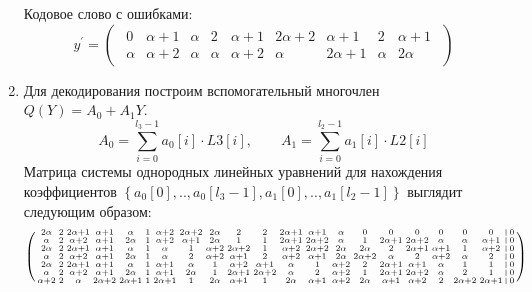 \documentclass{article}
\numberwithin{equation}{section}
\begin{document}
\begin{enumerate}
	Кодовое слово с ошибками:
	\[
		y^{'} =
		\begin{pmatrix}
			\begin{matrix} 
				0 & \alpha + 1 & \alpha & 2 & \alpha + 1 & 2\alpha + 2 & \alpha + 1 & 2 & \alpha + 1 \\
				\alpha & \alpha + 2 & \alpha & \alpha & \alpha + 2 & \alpha & 2\alpha + 1 & \alpha & 2\alpha
			\end{matrix}
		\end{pmatrix}
	\]
\item Для декодирования построим вспомогательный многочлен \\
$ Q(Y) = A_0 + A_1 Y $. \\
\[ A_0 = \sum_{i=0}^{l_3-1}{a_0[i] \cdot L3[i] }, \qquad
A_1 = \sum_{i=0}^{l_2-1}{a_1[i] \cdot L2[i] } \]
Матрица системы однородных линейных уравнений для нахождения коэффициентов $ \left\lbrace a_0[0],..,a_0[l_3-1],a_1[0],..,a_1[l_2-1] \right\rbrace $ выглядит следующим образом:
\[
\begin{pmatrix}
	\begin{smallmatrix} 
		2\alpha & 2 & 2\alpha + 1 & \alpha + 1 & \alpha & 1 & \alpha + 2 & 2\alpha + 2 & 2\alpha & 2 & 2 & 2\alpha + 1 & \alpha + 1 & \alpha & 0 & 0 & 0 & 0 & 0 & 0 & \vline & 0 \\
		\alpha & 2 & \alpha + 2 & \alpha + 1 & 2\alpha & 1 & \alpha + 2 & \alpha + 1 & 2\alpha & 1 & 1 & 2\alpha + 1 & 2\alpha + 2 & \alpha & 1 & 2\alpha + 1 & 2\alpha + 2 & \alpha & \alpha & \alpha + 1 & \vline & 0 \\
		2\alpha & 2 & 2\alpha + 1 & \alpha + 1 & \alpha & 1 & \alpha & 1 & \alpha + 2 & 2\alpha + 2 & 1 & \alpha + 2 & 2\alpha + 2 & 2\alpha & 2\alpha & 2 & 2\alpha + 1 & \alpha + 1 & 1 & \alpha + 2 & \vline & 0 \\
		\alpha & 2 & \alpha + 2 & \alpha + 1 & 2\alpha & 1 & \alpha & 2 & \alpha + 2 & \alpha + 1 & 2 & \alpha + 2 & \alpha + 1 & 2\alpha & 2\alpha + 2 & \alpha & 2 & \alpha + 2 & \alpha & 2 & \vline & 0 \\
		2\alpha & 2 & 2\alpha + 1 & \alpha + 1 & \alpha & 1 & \alpha + 1 & \alpha & 1 & \alpha + 2 & \alpha + 1 & \alpha & 1 & \alpha + 2 & 2 & 2\alpha + 1 & \alpha + 1 & \alpha & 1 & 1 & \vline & 0 \\
		\alpha & 2 & \alpha + 2 & \alpha + 1 & 2\alpha & 1 & \alpha + 1 & 2\alpha & 1 & 2\alpha + 1 & 2\alpha + 2 & \alpha & 2 & \alpha + 2 & 1 & 2\alpha + 1 & 2\alpha + 2 & \alpha & 2 & 1 & \vline & 0 \\
		\alpha + 2 & 2 & \alpha & 2\alpha + 2 & 2\alpha + 1 & 1 & 2\alpha + 1 & 1 & 2\alpha & \alpha + 1 & 1 & 2\alpha & \alpha + 1 & \alpha + 2 & 2\alpha & \alpha + 1 & \alpha + 2 & 2 & 2\alpha + 2 & 2\alpha + 1 & \vline & 0 \\

\end{smallmatrix}
\end{pmatrix}\]
\end{enumerate}
\end{document}

